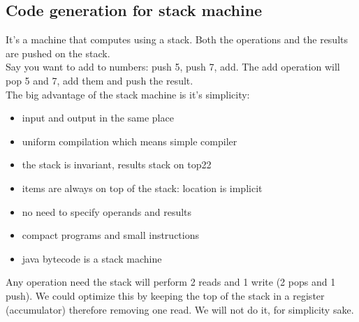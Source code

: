 \documentclass[12pt]{article}
\begin{document}

\subsection{Code generation for stack machine} 
It's a machine that computes using a stack. 
Both the operations and the results are pushed on the stack.
\\ Say you want to add to numbers: push 5, push 7, add.
The add operation will pop 5 and 7, add them and push the result.
\\ The big advantage of the stack machine is it's simplicity:
\begin{itemize}
    \item input and output in the same place
    \item uniform compilation which means simple compiler
    \item the stack is invariant, results stack on top22
    \item items are always on top of the stack: location is implicit
    \item no need to specify operands and results 
    \item compact programs and small instructions 
    \item java bytecode is a stack machine
\end{itemize}
Any operation need the stack will perform 2 reads and 1 write (2 pops and 1 push). We could optimize this by keeping the top of the stack in a register (accumulator) therefore removing one read. We will not do it, for simplicity sake.
\end{document}
